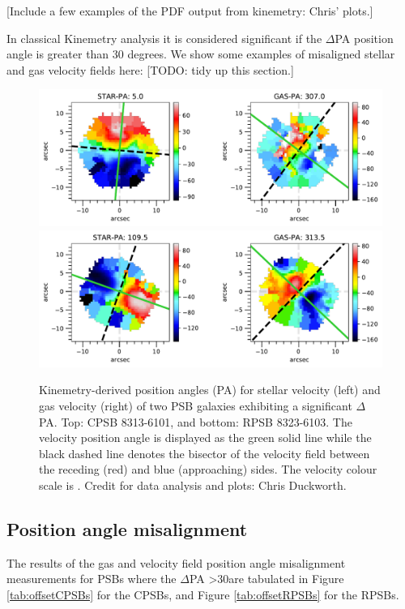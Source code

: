 [Include a few examples of the PDF output from kinemetry: Chris' plots.]

In classical Kinemetry analysis it is considered significant if the $\Delta$PA position angle is greater than 30 degrees. We show some examples of misaligned stellar and gas velocity fields here: 
[TODO: tidy up this section.]

\begin{figure}[h]
    \centering
    \includegraphics[width=\columnwidth]{images/PAplots/PAplotsCPSB/8313-6101-PA.pdf}
    \includegraphics[width=\columnwidth]{images/PAplots/PAplotsRPSB/8323-6103-PA.pdf}
    \caption{Kinemetry-derived position angles (PA) for stellar velocity (left) and gas velocity (right) of two PSB galaxies exhibiting a significant $\Delta$PA. Top: CPSB 8313-6101, and bottom: RPSB 8323-6103. The velocity position angle is displayed as the green solid line while the black dashed line denotes the bisector of the velocity field between the receding (red) and blue (approaching) sides. The velocity colour scale is \kms. Credit for data analysis and plots: Chris Duckworth.}
    \label{fig:CPSB-8313-6101-PA}
\end{figure}

\subsection{Position angle misalignment}
\label{PA-misalignment}
The results of the gas and velocity field position angle misalignment measurements for PSBs where the $\Delta$PA \textgreater 30\textdegree are tabulated in Figure \ref{tab:offsetCPSBs} for the CPSBs, and Figure \ref{tab:offsetRPSBs} for the RPSBs. 


